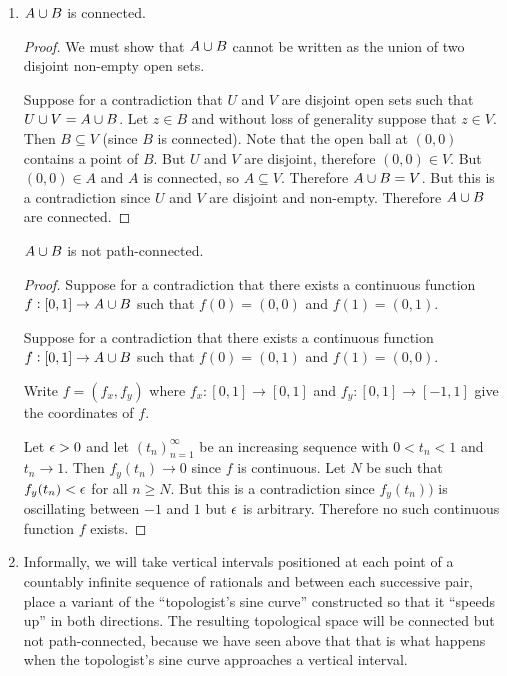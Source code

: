 \begin{enumerate}
\item
  \begin{claim*}
    $A \cup B$ is connected.
  \end{claim*}

  \begin{proof}
    We must show that $A \cup B$ cannot be written as the union of two disjoint non-empty open sets.

    Suppose for a contradiction that $U$ and $V$ are disjoint open sets such that $U \cup V = A \cup B$.
    Let $z \in B$ and without loss of generality suppose that $z \in V$. Then $B \subseteq V$ (since $B$ is
    connected). Note that the open ball at $(0, 0)$ contains a point of $B$. But $U$ and $V$ are disjoint,
    therefore $(0, 0) \in V$. But $(0, 0) \in A$ and $A$ is connected, so $A \subseteq V$.
    Therefore $A \cup B = V$. But this is a contradiction since $U$ and $V$ are disjoint and non-empty.
    Therefore $A \cup B$ are connected.
  \end{proof}


  \begin{claim*}
    $A \cup B$ is not path-connected.
  \end{claim*}

  \begin{proof}
    Suppose for a contradiction that there exists a continuous function $f: [0, 1] \to A \cup B$ such
    that $f(0) = (0, 0)$ and $f(1) = (0, 1)$.

    Suppose for a contradiction that there exists a continuous function $f: [0, 1] \to A \cup B$ such
    that $f(0) = (0, 1)$ and $f(1) = (0, 0)$.

    Write $f = (f_x, f_y)$ where $f_x: [0, 1] \to [0, 1]$ and $f_y: [0, 1] \to [-1, 1]$ give the coordinates of $f$.

    Let $\epsilon > 0$ and let $(t_n)_{n=1}^\infty$ be an increasing sequence with $0 < t_n < 1$ and $t_n \to 1$.
    Then $f_y(t_n) \to 0$ since $f$ is continuous. Let $N$ be such that $f_y(t_n) < \epsilon$ for all $n \geq N$. But
    this is a contradiction since $f_y (t_n))$ is oscillating between $-1$ and $1$ but $\epsilon$ is arbitrary.
    Therefore no such continuous function $f$ exists.
  \end{proof}
\item

  Informally, we will take vertical intervals positioned at each point of a countably infinite sequence of
  rationals and between each successive pair, place a variant of the ``topologist's sine curve​'' constructed so
  that it ``speeds up​'' in both directions. The resulting topological space will be connected but not
  path-connected, because we have seen above that that is what happens when the topologist's sine curve
  approaches a vertical interval.


\end{enumerate}
